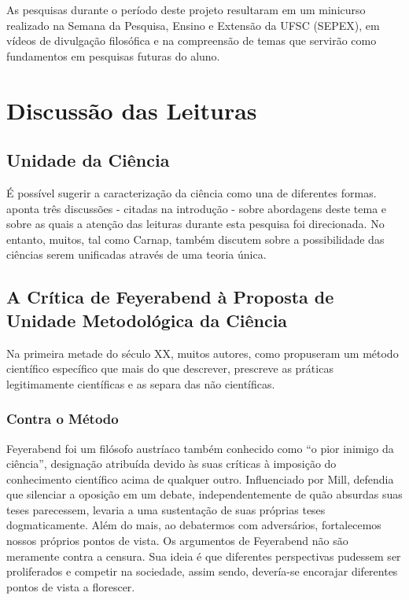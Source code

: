 \documentclass[12pt]{report}
\begin{document}
	As pesquisas durante o período deste projeto resultaram em um minicurso realizado na Semana da Pesquisa, Ensino e Extensão da UFSC (SEPEX), em vídeos de divulgação filosófica e na compreensão de temas que servirão como fundamentos em pesquisas futuras do aluno.
	
	\section{Discussão das Leituras}
	
	\subsection{Unidade da Ciência}
	
		É possível sugerir a caracterização da ciência como una de diferentes formas.
		\textcite{cunha-unidade} aponta três discussões - citadas na introdução - sobre abordagens deste tema e sobre as quais a atenção das leituras durante esta pesquisa foi direcionada.
		No entanto, muitos, tal como Carnap, também discutem sobre a possibilidade das ciências serem unificadas através de uma teoria única.
		
	\subsection{A Crítica de Feyerabend à Proposta de Unidade Metodológica da Ciência}
		
		Na primeira metade do século XX, muitos autores, como \textcite{popper_conjeturas} propuseram um método científico específico que mais do que descrever, prescreve as práticas legitimamente científicas e as separa das não científicas.
		
		\subsubsection{Contra o Método}
			
			Feyerabend foi um filósofo austríaco também conhecido como ``o pior inimigo da ciência'', designação atribuída devido às suas críticas à imposição do conhecimento científico acima de qualquer outro.
			Influenciado por Mill, defendia que silenciar a oposição em um debate, independentemente de quão absurdas suas teses parecessem, levaria a uma sustentação de suas próprias teses dogmaticamente.
			Além do mais, ao debatermos com adversários, fortalecemos nossos próprios pontos de vista.
			Os argumentos de Feyerabend não são meramente contra a censura.
			Sua ideia é que diferentes perspectivas pudessem ser proliferados e competir na sociedade, assim sendo, devería-se encorajar diferentes pontos de vista a florescer.
			
\end{document}
